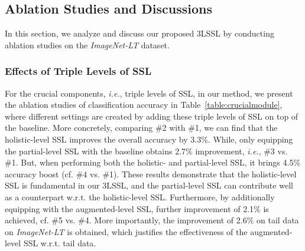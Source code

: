 \documentclass[10pt,journal,compsoc]{IEEEtran}
\newcommand{\ie}{\emph{i.e.}}
\begin{document}
\subsection{Ablation Studies and Discussions}

In this section, we analyze and discuss our proposed 3LSSL by conducting ablation studies on the \emph{ImageNet-LT} dataset.

\subsubsection{Effects of Triple Levels of SSL}

For the crucial components, \ie, triple levels of SSL, in our method, we present the ablation studies of classification accuracy in Table~\ref{table:crucialmodule}, where different settings are created by adding these triple levels of SSL on top of the baseline. More concretely, comparing \#2 with \#1, we can find that the holistic-level SSL improves the overall accuracy by 3.3\%. While, only equipping the partial-level SSL with the baseline obtains 2.7\% improvement, \ie, \#3 vs. \#1. But, when performing both the holistic- and partial-level SSL, it brings 4.5\% accuracy boost (cf. \#4 vs. \#1). These results demonstrate that the holistic-level SSL is fundamental in our 3LSSL, and the partial-level SSL can contribute well as a counterpart w.r.t. the holistic-level SSL. Furthermore, by additionally equipping with the augmented-level SSL, further improvement of 2.1\% is achieved, cf. \#5 vs. \#4. More importantly, the improvement of 2.6\% on tail data on \emph{ImageNet-LT} is obtained, which justifies the effectiveness of the augmented-level SSL w.r.t. tail data.
\end{document}
